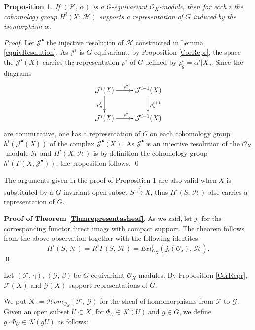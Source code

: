 \documentclass[xypic,amscd,syntonly,amssymb,verbatim,12pt]{amsart}
\theoremstyle{plain}
\newtheorem{Prop}[Thm]{Proposition}
\theoremstyle{definition}
\theoremstyle{remark}
\numberwithin{equation}{section}
\begin{document}
\begin{Prop}\label{Proprephcoho}
 If $({\mathcal H},\,\alpha)$ is a $G$-equivariant ${\mathcal O}_X$-module, then for
 each $i$ the cohomology group $H^i(X;\,{\mathcal H})$ supports a
 representation of $G$ induced by the isomorphism $\alpha$.
  \end{Prop}
{\it Proof.} Let ${\mathcal J}^{\bullet}$ the injective resolution
of ${\mathcal H}$ constructed in Lemma \ref{equivResolution}. As
${\mathcal J}^i$ is $G$-equivariant, by Proposition \ref{CorRepr},
the space the ${\mathcal J}^{i}(X)$ carries the representation
$\rho^i$ of $G$
 defined by $\rho^i_g=\alpha^i|X_g$.
 Since the diagrams
\begin{equation}\label{DiagExact2}
    \xymatrix{  {\mathcal J^i}(X) \ar[d]_{\rho^i_g}\ar[r]^{{d}^i} & {\mathcal J}^{i+1}(X)\ar[d]^{\rho_g^{i+1}} \\
   {\mathcal J}^i(X)\ar[r]^{{d}^i} & {\mathcal J}^{i+1}(X)
  }
 \end{equation}
  are commutative,
  one has a representation of $G$ on each cohomology group $h^i({\mathcal J}^{\bullet }(X))$ of
 the complex ${\mathcal J}^{\bullet}(X)$.
 As ${\mathcal J}^{\bullet}$ is an injective resolution of
  the ${\mathcal O}_X$-module ${\mathcal H}$ and
  $H^i(X,\,{\mathcal H})$ is by definition the cohomology group
  $h^i(\Gamma(X,\,{\mathcal J}^{\bullet }))$,  the proposition follows.
   \qed



\smallskip

 The arguments given in the proof of Proposition \ref{Proprephcoho} are also valid when $X$
 is substituted by a $G$-invariant open subset
  $S\stackrel{j}{\hookrightarrow}X$, thus $H^i(S,\,{\mathcal H})$ also carries a representation of $G$.
 

 \smallskip
 \noindent
 {\bf Proof of Theorem \ref{Thmrepresentasheaf}.} As we said, let
 $j_!$ for the corresponding functor direct image with compact
 support. The theorem follows from the above observation together with the following identites
 $$H^i(S,\,{\mathcal H})=R^i\Gamma(S,\,{\mathcal H})=Ext^i_{{\mathcal O}_X}(j_!({\mathcal O}_S),\,{\mathcal H}).$$
 \qed




Let $({\mathcal F},\,\gamma)$, $({\mathcal G},\,\beta)$ be
$G$-equivariant ${\mathcal O}_X$-modules.
 By Proposition \ref{CorRepr},   ${\mathcal F}(X)$ and
 ${\mathcal G}(X)$ support representations of $G$.
  
  
  We put ${\mathcal K}:={\mathcal Hom}_{\mathcal O_X}({\mathcal F},\,{\mathcal
G})$ for the sheaf of homomorphisms from ${\mathcal F}$ to
${\mathcal G}$. Given an open subset $U\subset X$, for $\Phi_U\in
{\mathcal K}(U)$ and $g\in G$, we define $g\cdot\Phi_U\in{\mathcal
K}(gU)$ as follows:
\end{document}
